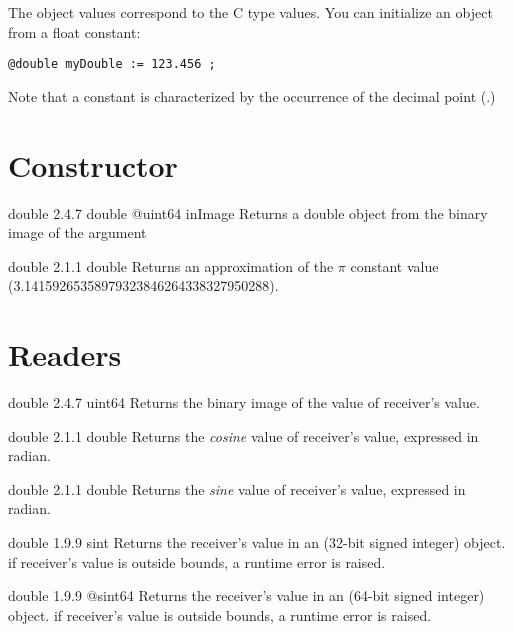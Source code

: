 

The  object values correspond to the C type  values. You can initialize an  object from a float constant:

\texttt{@double myDouble := 123.456 ;}

Note that a  constant is characterized by the occurrence of the decimal point (.)

\section{Constructor}

{double}
{2.4.7}
{double}
{@uint64 inImage}
{Returns a double object from the binary image of the argument}
{}

{double}
{2.1.1}
{double}
{Returns an approximation of the $\pi$ constant value (3.14159265358979323846264338327950288).}
{}

\section{Readers}

{double}
{2.4.7}
{uint64}
{Returns the binary image of the value of receiver's value.}
{}




{double}
{2.1.1}
{double}
{Returns the \emph{cosine} value of receiver's value, expressed in radian.}
{}




{double}
{2.1.1}
{double}
{Returns the \emph{sine} value of receiver's value, expressed in radian.}
{}




{double}
{1.9.9}
{sint}
{Returns the receiver's value in an  (32-bit signed integer) object.}
{if receiver's value is outside  bounds, a runtime error is raised.}



{double}
{1.9.9}
{@sint64}
{Returns the receiver's value in an  (64-bit signed integer) object.}
{if receiver's value is outside  bounds, a runtime error is raised.}




